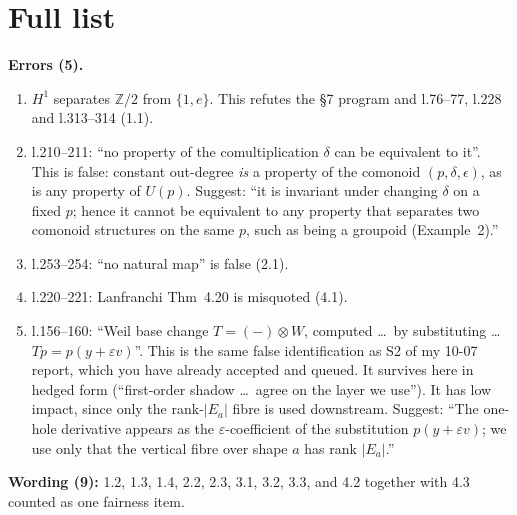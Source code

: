 \documentclass[11pt]{article}
\newcommand{\Z}{\mathbb{Z}}
\begin{document}
\section{Full list}
\textbf{Errors (5).}
\begin{enumerate}[label=\textbf{E\arabic*.},leftmargin=*]
\item $H^1$ separates $\Z/2$ from $\{1,e\}$. This refutes the \S7 program and l.76--77, l.228 and
l.313--314 (1.1).
\item l.210--211: ``no property of the comultiplication $\delta$ can be equivalent to it''. This is
false: constant out-degree \emph{is} a property of the comonoid $(p,\delta,\epsilon)$, as is any
property of $U(p)$. Suggest: ``it is invariant under changing $\delta$ on a fixed $p$; hence it
cannot be equivalent to any property that separates two comonoid structures on the same $p$, such
as being a groupoid (Example~2).''
\item l.253--254: ``no natural map'' is false (2.1).
\item l.220--221: Lanfranchi Thm~4.20 is misquoted (4.1).
\item l.156--160: ``Weil base change $T=(-)\otimes W$, computed \dots\ by substituting \dots\
$Tp=p(y+\varepsilon v)$''. This is the same false identification as S2 of my 10-07 report, which
you have already accepted and queued. It survives here in hedged form (``first-order shadow \dots\
agree on the layer we use''). It has low impact, since only the rank-$|E_a|$ fibre is used
downstream. Suggest: ``The one-hole derivative appears as the $\varepsilon$-coefficient of the
substitution $p(y+\varepsilon v)$; we use only that the vertical fibre over shape $a$ has rank
$|E_a|$.''
\end{enumerate}
\textbf{Wording (9):} 1.2, 1.3, 1.4, 2.2, 2.3, 3.1, 3.2, 3.3, and 4.2 together with 4.3 counted as
one fairness item.
\end{document}
